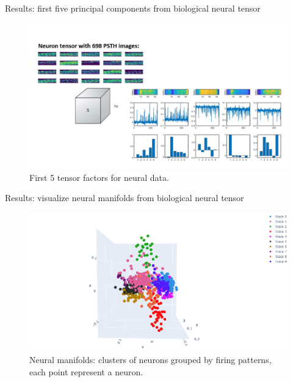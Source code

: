 \documentclass[xcolor={dvipsnames,svgnames}]{beamer}
\begin{document}
\begin{frame}{Results: first five principal components from biological neural tensor}
    \begin{figure}[H]
        \centering
            \includegraphics[width=\textwidth]{Slide3.jpg}
            \caption{First 5 tensor factors for neural data.}
        \end{figure} 
\end{frame}
\begin{frame}{Results: visualize neural manifolds from biological neural tensor}
    \begin{figure}[H]
        \centering
            \includegraphics[width=\textwidth]{figures/embeddings/embedding-lab.png}
            \caption{Neural manifolds: clusters of neurons grouped by firing patterns, each point represent a neuron.}
        \end{figure} 
\end{frame}
\end{document}
